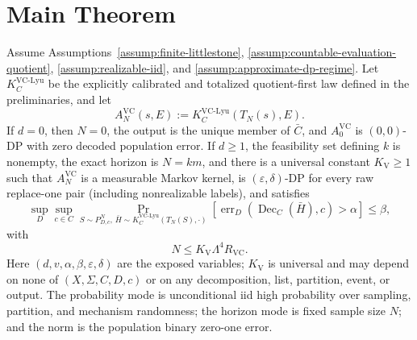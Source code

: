 \section{Main Theorem}

\begin{theorem}\label{thm:main}
Assume Assumptions~\ref{assump:finite-littlestone},
\ref{assump:countable-evaluation-quotient},
\ref{assump:realizable-iid}, and
\ref{assump:approximate-dp-regime}.  Let $K_C^{\mathrm{VC\text{-}Lyu}}$
be the explicitly calibrated and totalized quotient-first law defined in
the preliminaries, and let
\[
 A_N^{\mathrm{VC}}(s,E):=K_C^{\mathrm{VC\text{-}Lyu}}(T_N(s),E).
\]
If $d=0$, then $N=0$, the output is the unique member of $\bar C$, and
$A_0^{\mathrm{VC}}$ is $(0,0)$-DP with zero decoded population error.  If
$d\ge1$, the feasibility set defining $k$ is nonempty, the exact horizon is
$N=km$, and there is a universal constant $K_{\mathrm V}\ge1$ such that
$A_N^{\mathrm{VC}}$ is a measurable
Markov kernel, is $(\varepsilon,\delta)$-DP for every raw replace-one pair
(including nonrealizable labels), and satisfies
\[
 \sup_D\sup_{c\in C}
 \Pr_{S\sim P_{D,c}^{N},\,\bar H\sim K_C^{\mathrm{VC\text{-}Lyu}}(T_N(S),\cdot)}
 \left[\operatorname{err}_D(\operatorname{Dec}_C(\bar H),c)>\alpha\right]
 \le\beta,
\]
with
\[
 N\le K_{\mathrm V}\Lambda^{4}R_{\mathrm{VC}}.
\]
Here $(d,v,\alpha,\beta,\varepsilon,\delta)$ are the exposed variables;
$K_{\mathrm V}$ is universal and may depend on none of
$(X,\Sigma,C,D,c)$ or on any decomposition, list, partition, event, or
output.  The probability mode is unconditional iid high probability over
sampling, partition, and mechanism randomness; the horizon mode is fixed
sample size $N$; and the norm is the population binary zero-one error.


\end{theorem}
